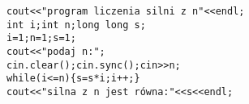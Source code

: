 \begin{verbatim}
cout<<"program liczenia silni z n"<<endl;   
int i;int n;long long s;
i=1;n=1;s=1;
cout<<"podaj n:";
cin.clear();cin.sync();cin>>n;
while(i<=n){s=s*i;i++;}
cout<<"silna z n jest równa:"<<s<<endl;
\end{verbatim}